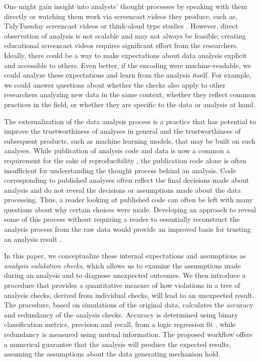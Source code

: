 \documentclass[
  12pt,
]{interact}
\begin{document}
One might gain insight into analysts' thought processes by speaking with
them directly or watching them work via screencast videos they produce,
such as, TidyTuesday screencast videos or think-aloud type studies
\citep[e.g.][]{gu2024data}. However, direct observation of analysis is
not scalable and may not always be feasible; creating educational
screencast videos requires significant effort from the researchers.
Ideally, there could be a way to make expectations about data analysis
explicit and accessible to others. Even better, if the encoding were
machine-readable, we could analyze these expectations and learn from the
analysis itself. For example, we could answer questions about whether
the checks also apply to other researchers analyzing new data in the
same context, whether they reflect common practices in the field, or
whether they are specific to the data or analysis at hand.

The externalization of the data analysis process is a practice that has
potential to improve the trustworthiness of analyses in general and the
trustworthiness of subsequent products, such as machine learning models,
that may be built on such analyses. While publication of analysis code
and data is now a common a requirement for the sake of reproducibility
\citep{peng2011reproducible}, the publication code alone is often
insufficient for understanding the thought process behind an analysis.
Code corresponding to published analyses often reflect the final
decisions made about analysis and do not reveal the decisions or
assumptions made about the data processing. Thus, a reader looking at
published code can often be left with many questions about why certain
choices were made. Developing an approach to reveal some of this process
without requiring a reader to essentially reconstruct the analysis
process from the raw data would provide an improved basis for trusting
an analysis result \citep{peng2021reproducible}.

In this paper, we conceptualize these internal expectations and
assumptions as \emph{analysis validation checks}, which allows us to
examine the assumptions made during an analysis and to diagnose
unexpected outcomes. We then introduce a procedure that provides a
quantitative measure of how violations in a tree of analysis checks,
derived from individual checks, will lead to an unexpected result. The
procedure, based on simulations of the original data, calculates the
accuracy and redundancy of the analysis checks. Accuracy is determined
using binary classification metrics, precision and recall, from a logic
regression fit \citep{ruczinski_logic_2003}, while redundancy is
measured using mutual information. The proposed workflow offers a
numerical guarantee that the analysis will produce the expected results,
assuming the assumptions about the data generating mechanism hold.
\end{document}
